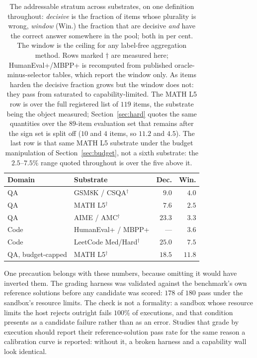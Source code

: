 \documentclass{article}
\begin{document}
\begin{table}[t]
\caption{The addressable stratum across substrates, on one definition
throughout: \emph{decisive} is the fraction of items whose plurality is wrong,
\emph{window} (Win.) the fraction that are decisive \emph{and} have the
correct answer somewhere in the pool; both in per cent. The window is the ceiling for any label-free
aggregation method. Rows marked $\dagger$ are measured here; HumanEval+/MBPP+
is recomputed from published oracle-minus-selector tables, which report the
window only. As items harden the decisive fraction grows but the window does
not: they pass from saturated to capability-limited. The MATH L5 row is over
the full registered list of $119$ items, the substrate being the object
measured; Section~\ref{sec:hard} quotes the same quantities over the $89$-item
evaluation set that remains after the sign set is split off ($10$ and $4$
items, so $11.2$ and $4.5$). The last row is that same MATH L5 substrate
under the budget manipulation of Section~\ref{sec:budget}, not a sixth
substrate: the $2.5$--$7.5\%$ range quoted throughout is over the five
above it.}
\label{tab:window}
\centering\footnotesize
\setlength{\tabcolsep}{4pt}
\setlength{\tabcolsep}{3pt}
\begin{tabular}{@{}l l r r@{}}
\toprule
Domain & Substrate & Dec. & Win. \\
\midrule
QA & GSM8K / CSQA$^\dagger$ & $9.0$ & $4.0$ \\
QA & MATH L5$^\dagger$ & $7.6$ & $2.5$ \\
QA & AIME / AMC$^\dagger$ & $23.3$ & $3.3$ \\
Code & HumanEval+ / MBPP+ & --- & $3.6$ \\
Code & LeetCode Med/Hard$^\dagger$ & $25.0$ & $7.5$ \\
QA, budget-capped & MATH L5$^\dagger$ & $18.5$ & $11.8$ \\
\bottomrule
\end{tabular}
\end{table}

One precaution belongs with these numbers, because omitting it would have
inverted them. The grading harness was validated against the benchmark's own
reference solutions before any candidate was scored: $178$ of $180$ pass
under the sandbox's resource limits. The check is not a formality: a sandbox whose
resource limits the host rejects outright fails $100\%$ of executions, and
that condition presents as a candidate failure rather than as an error. Studies that grade by execution should report their
reference-solution pass rate for the same reason a calibration curve is
reported: without it, a broken harness and a capability wall look identical.
\end{document}

